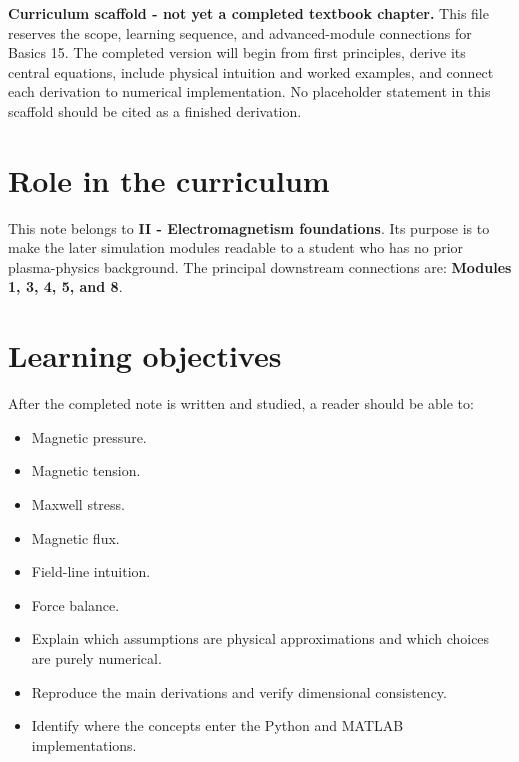 \documentclass[11pt]{article}
\begin{document}

\begin{overviewbox}
\textbf{Curriculum scaffold - not yet a completed textbook chapter.} This file reserves the scope, learning sequence, and advanced-module connections for Basics 15. The completed version will begin from first principles, derive its central equations, include physical intuition and worked examples, and connect each derivation to numerical implementation. No placeholder statement in this scaffold should be cited as a finished derivation.
\end{overviewbox}

\ProjectTOC

\section{Role in the curriculum}
This note belongs to \textbf{II - Electromagnetism foundations}. Its purpose is to make the later simulation modules readable to a student who has no prior plasma-physics background. The principal downstream connections are: \textbf{Modules 1, 3, 4, 5, and 8}.

\section{Learning objectives}
After the completed note is written and studied, a reader should be able to:
\begin{itemize}[leftmargin=1.6em]
\item Magnetic pressure.
\item Magnetic tension.
\item Maxwell stress.
\item Magnetic flux.
\item Field-line intuition.
\item Force balance.
\item Explain which assumptions are physical approximations and which choices are purely numerical.
\item Reproduce the main derivations and verify dimensional consistency.
\item Identify where the concepts enter the Python and MATLAB implementations.
\end{itemize}
\end{document}

